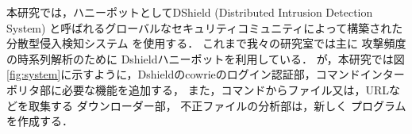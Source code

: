\documentclass[dvipdfmx]{bta}
\begin{document}


本研究では，ハニーポットとしてDShield
(Distributed Intrusion Detection System)\cite{DShield}
と呼ばれるグローバルなセキュリティコミュニティによって構築された分散型侵入検知システム
を使用する．
これまで我々の研究室では主に
攻撃頻度の時系列解析のために
Dshieldハニーポットを利用している\cite{nishida2022}．
が，本研究では図\ref{fig:system}に示すように，Dshieldのcowrie\cite{Cowrie}のログイン認証部，コマンドインターポリタ部に必要な機能を追加する，
また，コマンドからファイル又は，URLなどを取集する
ダウンローダー部，
不正ファイルの分析部は，新しく
プログラムを作成する．

\end{document}
